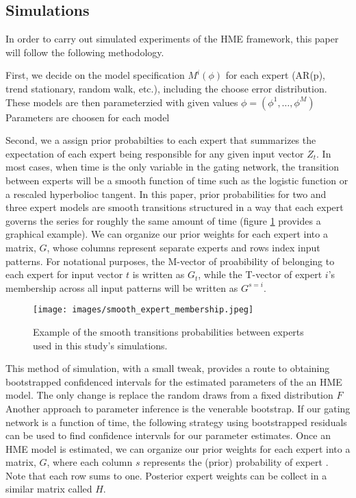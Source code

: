\documentclass[12pt]{article}
\begin{document}
\subsection{Simulations}
In order to carry out simulated experiments of the HME framework, this paper will follow the following methodology.

First, we decide on the model specification $M^{i}(\phi)$ for each expert (AR(p), trend stationary, random walk, etc.), including the choose error distribution. These models are then parameterzied with given values $\phi=(\phi^{1},\dots,\phi^{M})$ Parameters are choosen for each model

Second, we a assign prior probabilties to each expert that summarizes the expectation of each expert being responsible for any given input vector $Z_{t}$. In most cases, when time is the only variable in the gating network, the transition between experts will be a smooth function of time such as the logistic function or a rescaled hyperbolioc tangent. In this paper, prior probabilities for two and three expert models are smooth transitions structured in a way that each expert governs the series for roughly the same amount of time (figure \ref{fig:expertmembership} provides a graphical example). We can organize our prior weights for each expert into a matrix, $G$, whose columns represent separate experts and rows index input patterns. For notational purposes, the M-vector of proabibility of belonging to each expert for input vector $t$ is written as $G_{t}$, while the T-vector of expert $i$'s membership across all input patterns will be written as $G^{s=i}$.

\begin{figure}[ht]
  \centering
  \texttt{[image: images/smooth\_expert\_membership.jpeg]}
  \caption{Example of the smooth transitions probabilities between experts used in this study's simulations.}
  \label{fig:expertmembership}
\end{figure}

This method of simulation, with a small tweak, provides a route to obtaining bootstrapped confidenced intervals for the estimated parameters of the an HME model. The only change is replace the random draws from a fixed distribution $F$ Another approach to parameter inference is the venerable bootstrap. If our gating network is a function of time, the following strategy using bootstrapped residuals can be used to find confidence intervals for our parameter estimates. Once an HME model is estimated, we can organize our prior weights for each expert into a matrix, $G$, where each column $s$ represents the (prior) probability of expert . Note that each row sums to one. Posterior expert weights can be collect in a similar matrix called $H$.
\end{document}
